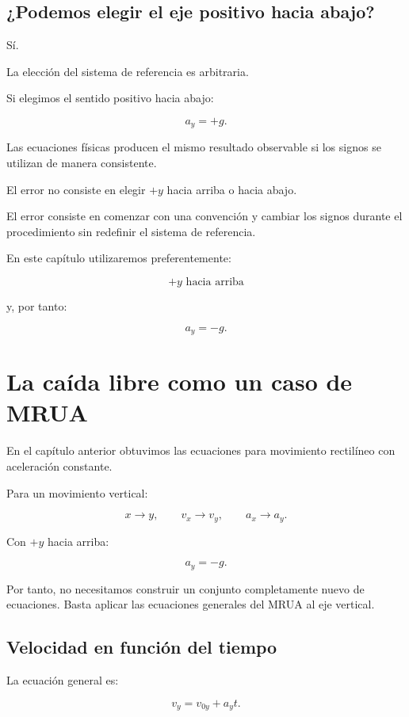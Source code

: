 \subsection{¿Podemos elegir el eje positivo hacia abajo?}

Sí.

La elección del sistema de referencia es arbitraria.

Si elegimos el sentido positivo hacia abajo:

\[ a_y=+g. \]

Las ecuaciones físicas producen el mismo resultado observable si los signos se utilizan de manera consistente.

\begin{advertencia}
El error no consiste en elegir \(+y\) hacia arriba o hacia abajo.

El error consiste en comenzar con una convención y cambiar los signos durante el procedimiento sin redefinir el sistema de referencia.
\end{advertencia}

En este capítulo utilizaremos preferentemente:

\[ \boxed{+y\text{ hacia arriba}} \]

y, por tanto:

\[ \boxed{a_y=-g}. \]


\section{La caída libre como un caso de MRUA}

En el capítulo anterior obtuvimos las ecuaciones para movimiento rectilíneo con aceleración constante.

Para un movimiento vertical:

\[
x\longrightarrow y,
\qquad
v_x\longrightarrow v_y,
\qquad
a_x\longrightarrow a_y.
\]

Con \(+y\) hacia arriba:

\[ a_y=-g. \]

Por tanto, no necesitamos construir un conjunto completamente nuevo de ecuaciones. Basta aplicar las ecuaciones generales del MRUA al eje vertical.


\subsection{Velocidad en función del tiempo}

La ecuación general es:

\[ v_y=v_{0y}+a_yt. \]

